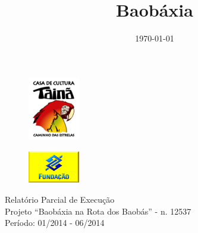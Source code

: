 \documentclass[a4paper, 11pt, oneside]{Relatorio_sem_2}  %
\begin{document}
\frontmatter	  %

\title  {Baobáxia}

\addresses  {\taina\\\npdd\\\redemocambos}  %
\date       {\today}
\subject    {Relatório de execução do projeto}

\maketitle

\setcounter{page}{1}
 
\begin{figure}[htbp]
  \centering
  \includegraphics[width=0.2\textwidth]{./Fig/Logo_Taina.pdf}
  \label{fig:LogoTaina}
\end{figure}
\begin{figure}[htbp]
  \centering
  \includegraphics[width=0.2\textwidth]{./Fig/Logo_FBB.pdf}
  \label{fig:LogoFBB}
\end{figure}

\begin{center}
\LARGE{Relatório Parcial de Execução}\\
\large{
  Projeto ``Baobáxia na Rota dos Baobás'' - n. 12537 \\
  Período: 01/2014 - 06/2014 
}

\end{center}
\end{document}
